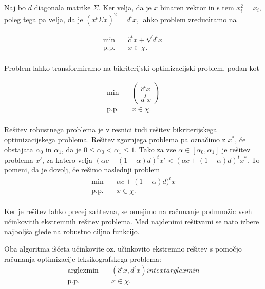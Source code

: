 \documentclass[a4paper, 12 pt]{article}
\theoremstyle{definition} %
\theoremstyle{plain} %
\theoremstyle{definition}
\begin{document}
Naj bo $d$ diagonala matrike $\Sigma$.
Ker velja, da je $x$ binaren vektor in s tem $x_{i}^2=x_{i}$, poleg tega pa velja, da je $(x^t  \Sigma x)^2 = d^tx$, lahko problem zreduciramo na

\begin{equation*}
\begin{aligned}
\min \quad &  \hat{c}^t x +\sqrt{d^tx}\\
\textrm{p.p.} \quad & x \in \chi.\\
\end{aligned}
\end{equation*}

Problem lahko transformiramo na bikriterijski optimizacijski problem, podan kot

\begin{equation*}
\begin{aligned}
\min \quad &  \begin{pmatrix} \hat{c}^t x \\ d^tx \end{pmatrix} \\
\textrm{p.p.} \quad & x \in \chi.\\
\end{aligned}
\end{equation*}

Rešitev robustnega problema je v resnici tudi rešitev bikriterijskega optimizacijskega problema. Rešitev zgornjega problema pa označimo z $x^*$, če obstajata  $\alpha_{0}$ in $\alpha_{1}$, da je $0 \le \alpha_{0} < \alpha_{1} \le 1$. Tako za vse $\alpha \in [\alpha_{0},\alpha_{1}]$ je rešitev problema $x'$, za katero velja $(\alpha c + (1 - \alpha)d)^tx' < (\alpha c + (1- \alpha)d)^tx^{*}$.\newline
 To pomeni, da je dovolj, če rešimo naslednji problem
\begin{equation*}
\begin{aligned}
\min \quad &  \alpha c + (1 - \alpha)d)^tx \\
\textrm{p.p.} \quad & x \in \chi.\\
\end{aligned}
\end{equation*}

Ker je rešitev lahko precej zahtevna, se omejimo na računanje podmnožic vseh učinkovitih ekstremnih rešitev problema. Med najdenimi rešitvami se nato izbere najboljša glede na robustno ciljno funkcijo.


Oba algoritma iščeta učinkovite oz. učinkovito ekstremno rešitev s pomočjo računanja optimizacije leksikografskega problema:
\begin{equation*}
\begin{aligned}
\text{arglexmin}\quad &  (\hat{c}^t x , {d^tx}) in text{arglexmin}\\
\textrm{p.p.} \quad & x \in \chi.\\
\end{aligned}
\end{equation*}
 
\end{document}
